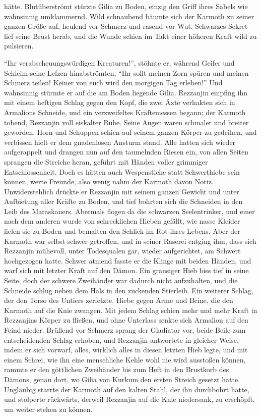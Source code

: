 hätte. Blutüberströmt stürzte Gilia zu Boden, einzig den Griff ihres Säbels wie wahnsinnig umklammernd. Wild schnaubend bäumte sich der Karmoth zu seiner ganzen Größe auf, heulend vor Schmerz und rasend vor Wut. Schwarzes Sekret lief seine Brust herab, und die Wunde schien im Takt einer höheren Kraft wild zu pulsieren.

``Ihr verabscheuungswürdigen Kreaturen!'', stöhnte er, während Geifer und Schleim seine Lefzen hinabströmten, ``Ihr sollt meinen Zorn spüren und meinen Schmerz teilen! Keiner von euch wird den morgigen Tag erleben!'' Und wahnsinnig stürmte er auf die am Boden liegende Gilia. Rezzanjin empfing ihn mit einem heftigen Schlag gegen den Kopf, die zwei Äxte verhakten sich in Armalions Schneide, und ein verzweifeltes Kräftemessen begann; der Karmoth tobend, Rezzanjin voll eiskalter Ruhe. Seine Augen waren schmaler und breiter geworden, Horn und Schuppen schien auf seinem ganzen Körper zu gedeihen, und verbissen hielt er dem gnadenlosen Ansturm stand. Alle hatten sich wieder aufgerappelt und drangen nun auf den taumelnden Riesen ein, von allen Seiten sprangen die Streiche heran, geführt mit Händen voller grimmiger Entschlossenheit. Doch es hätten auch Wespenstiche statt Schwerthiebe sein können, werte Freunde, also wenig nahm der Karmoth davon Notiz. Unwiderstehlich drückte er Rezzanjin mit seinem ganzen Gewicht und unter Aufbietung aller Kräfte zu Boden, und tief bohrten sich die Schneiden in den Leib des Maraskaners. Abermals flogen da die schwarzen Seelentrinker, und einer nach dem anderen wurde von schrecklichen Hieben gefällt, wie nasse Kleider fielen sie zu Boden und bemalten den Schlick im Rot ihres Lebens. Aber der Karmoth war selbst schwer getroffen, und in seiner Raserei entging ihm, dass sich Rezzanjin mühevoll, unter Todesqualen gar, wieder aufgerichtet, am Schwert hochgezogen hatte. Schwer atmend fasste er die Klinge mit beiden Händen, und warf sich mit letzter Kraft auf den Dämon. Ein grausiger Hieb biss tief in seine Seite, doch der schwere Zweihänder war dadurch nicht aufzuhalten, und die Schneide schlug neben dem Hals in den zuckenden Stierleib. Ein weiterer Schlag, der den Torso des Untiers zerfetzte. Hiebe gegen Arme und Beine, die den Karmoth auf die Knie zwangen. Mit jedem Schlag schien mehr und mehr Kraft in Rezzanjins Körper zu fließen, und ohne Unterlass senkte sich Armalion auf den Feind nieder. Brüllend vor Schmerz sprang der Gladiator vor, beide Beile zum entscheidenden Schlag erhoben, und Rezzanjin antwortete in gleicher Weise, indem er sich vorwarf, alles, wirklich alles in diesen letzten Hieb legte, und mit einem Schrei, wie ihn eine menschliche Kehle wohl nie wird ausstoßen können, rammte er den göttlichen Zweihänder bis zum Heft in den Brustkorb des Dämons, genau dort, wo Gilia von Kurkum den ersten Streich gesetzt hatte. Ungläubig starrte der Karmoth auf den kalten Stahl, der ihn durchbohrt hatte, und stolperte rückwärts, derweil Rezzanjin auf die Knie niedersank, zu erschöpft, um weiter stehen zu können.


